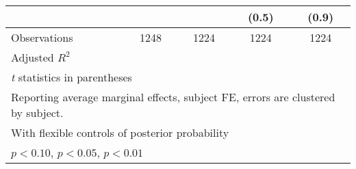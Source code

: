 \begin{table}[htbp]
\begin{tabular}{l*{4}{c}}
                &                  &                  &    (0.5)         &    (0.9)         \\
\hline
Observations    &     1248         &     1224         &     1224         &     1224         \\
Adjusted \(R^{2}\)&                  &                  &                  &                  \\
\hline\hline
\multicolumn{5}{l}{\footnotesize \textit{t} statistics in parentheses}\\
\multicolumn{5}{l}{\footnotesize Reporting average marginal effects, subject FE, errors are clustered by subject.}\\
\multicolumn{5}{l}{\footnotesize With flexible controls of posterior probability}\\
\multicolumn{5}{l}{\footnotesize \sym{*} \(p<0.10\), \sym{**} \(p<0.05\), \sym{***} \(p<0.01\)}\\
\end{tabular}
\end{table}
